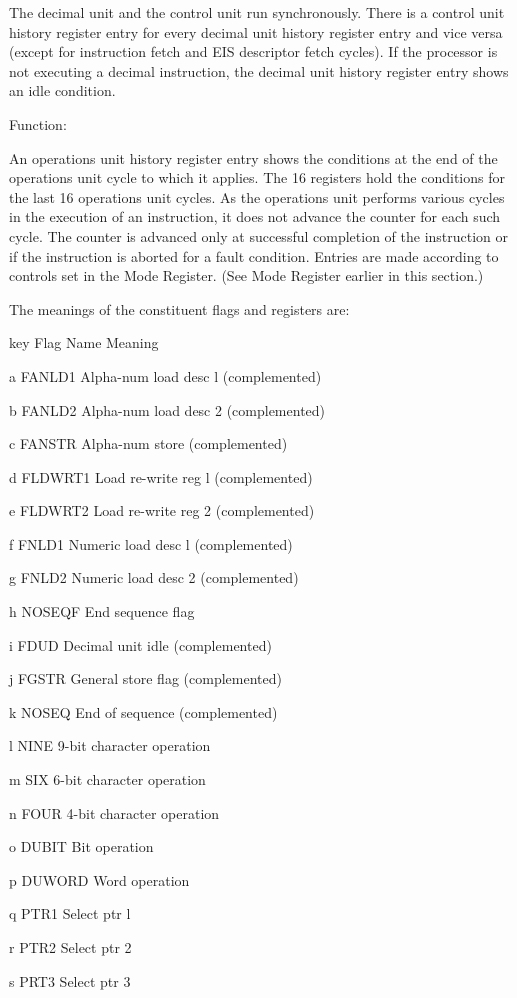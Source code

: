 The decimal unit and the control unit run synchronously. There is a control
unit history register entry for every decimal unit history register entry and
vice versa (except for instruction fetch and EIS descriptor fetch cycles). If
the processor is not executing a decimal instruction, the decimal unit history
register entry shows an idle condition.

Function:

An operations unit history register entry shows the conditions at the end of
the operations unit cycle to which it applies. The 16 registers hold the
conditions for the last 16 operations unit cycles. As the operations unit
performs various cycles in the execution of an instruction, it does not advance
the counter for each such cycle. The counter is advanced only at successful
completion of the instruction or if the instruction is aborted for a fault
condition. Entries are made according to controls set in the Mode Register.
(See Mode Register earlier in this section.)

The meanings of the constituent flags and registers are:

key Flag Name Meaning

a FANLD1 Alpha-num load desc l (complemented)

b FANLD2 Alpha-num load desc 2 (complemented)

c FANSTR Alpha-num store (complemented)

d FLDWRT1 Load re-write reg l (complemented)

e FLDWRT2 Load re-write reg 2 (complemented)

f FNLD1 Numeric load desc l (complemented)

g FNLD2 Numeric load desc 2 (complemented)

h NOSEQF End sequence flag

i FDUD Decimal unit idle (complemented)

j FGSTR General store flag (complemented)

k NOSEQ End of sequence (complemented)

l NINE 9-bit character operation

m SIX 6-bit character operation

n FOUR 4-bit character operation

o DUBIT Bit operation

p DUWORD Word operation

q PTR1 Select ptr l

r PTR2 Select ptr 2

s PRT3 Select ptr 3

